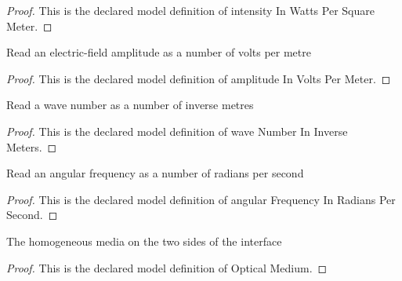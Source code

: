 \begin{proof}
  This is the declared model definition of intensity In Watts Per Square Meter.
\end{proof}
\begin{definition}
  \label{def:physics:phyx-mini-0104:phyxminiproblems-problemphyxmini0104-amplitudeinvoltspermeter}
  Read an electric-field amplitude as a number of volts per metre
\end{definition}
\begin{proof}
  This is the declared model definition of amplitude In Volts Per Meter.
\end{proof}
\begin{definition}
  \label{def:physics:phyx-mini-0104:phyxminiproblems-problemphyxmini0104-wavenumberininversemeters}
  Read a wave number as a number of inverse metres
\end{definition}
\begin{proof}
  This is the declared model definition of wave Number In Inverse Meters.
\end{proof}
\begin{definition}
  \label{def:physics:phyx-mini-0104:phyxminiproblems-problemphyxmini0104-angularfrequencyinradianspersecond}
  Read an angular frequency as a number of radians per second
\end{definition}
\begin{proof}
  This is the declared model definition of angular Frequency In Radians Per Second.
\end{proof}
\begin{definition}
  \label{def:physics:phyx-mini-0104:phyxminiproblems-problemphyxmini0104-opticalmedium}
  The homogeneous media on the two sides of the interface
\end{definition}
\begin{proof}
  This is the declared model definition of Optical Medium.
\end{proof}
